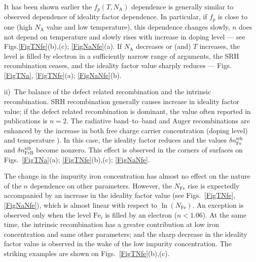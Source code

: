 ﻿\documentclass[12pt]{article}
\begin{document}
It has been shown earlier \cite{Olikh2018SM}  the $f_p(T,N_\mathrm{A})$ dependence is generally similar to observed dependence of ideality factor dependence.
In particular, if $f_p$ is close to one (high $N_\mathrm{A}$ value and low temperature), this dependence changes slowly,
$n$ does not depend on temperature and slowly rises with increase in doping level --- see Figs.\ref{FigTNfe}(b),(c); \ref{FigNaNfe}(a).
If $N_\mathrm{A}$ decreases or (and) $T$ increases,
the level is filled by electron in a sufficiently narrow range of arguments,
the SRH recombination ceases,
and the ideality factor value sharply  reduces --- Figs.\ref{FigTNa}, \ref{FigTNfe}(a); \ref{FigNaNfe}(b).

ii)~The balance of the defect related recombination and the intrinsic recombination.
SRH recombination generally causes increase in ideality factor value;
if the defect related recombination is dominant, the value often reported in publications is $n=2$.
The radiative band--to--band and Auger recombinations are enhanced by the increase in both free charge carrier concentration
(doping level) and temperature   \cite{Si_BtB,Si_Auger}).
In this case, the ideality factor reduces and the values $\delta n_\mathrm{Fe}^\mathrm{srh}$
and $\delta n_\mathrm{FeB}^\mathrm{srh}$ become nonzero.
This effect is observed in the corners of surfaces on Figs.~\ref{FigTNa}(a); \ref{FigTNfe}(b),(c); \ref{FigNaNfe}.


The change in the impurity iron concentration has almost no effect on the nature of the $n$ dependence on other parameters.
However, the $N_\mathrm{Fe}$ rise is expectedly accompanied by an increase in the ideality factor value (see Figs.~\ref{FigTNfe}, \ref{FigNaNfe}),
which is almost linear with respect to $\ln(N_\mathrm{Fe})$.
An exception is observed only when the level $\mathrm{Fe}_i$  is filled by an electron ($n<1.06$).
At the same time,
the intrinsic recombination has a greater contribution at low iron concentration and same other parameters;
and the sharp decrease in the ideality factor value is observed in the wake of the low impurity concentration.
The striking examples are shown on Figs.~\ref{FigTNfe}(b),(c).
\end{document}
